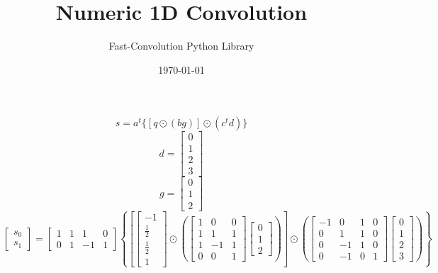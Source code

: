 \documentclass{article}%
\title{Numeric 1D Convolution}%
\author{Fast{-}Convolution Python Library}%
\date{\today}%
\begin{document}
%
\normalsize%
\maketitle%
\[%
s = a^t \{[q \odot (bg)] \odot (c^t d)\}%
\]%
\[%
d = \left[\begin{matrix}0\\1\\2\\3\end{matrix}\right]%
\]%
\[%
g = \left[\begin{matrix}0\\1\\2\end{matrix}\right]%
\]%
\[%
\left[\begin{matrix}s_{0}\\s_{1}\end{matrix}\right] = \left[\begin{matrix}1 & 1 & 1 & 0\\0 & 1 & -1 & 1\end{matrix}\right] \left\{ \left[ \left[\begin{matrix}-1\\\frac{1}{2}\\\frac{1}{2}\\1\end{matrix}\right] \odot \left( \left[\begin{matrix}1 & 0 & 0\\1 & 1 & 1\\1 & -1 & 1\\0 & 0 & 1\end{matrix}\right] \left[\begin{matrix}0\\1\\2\end{matrix}\right] \right) \right] \odot \left( \left[\begin{matrix}-1 & 0 & 1 & 0\\0 & 1 & 1 & 0\\0 & -1 & 1 & 0\\0 & -1 & 0 & 1\end{matrix}\right] \left[\begin{matrix}0\\1\\2\\3\end{matrix}\right] \right) \right\}%
\]%
\end{document}
